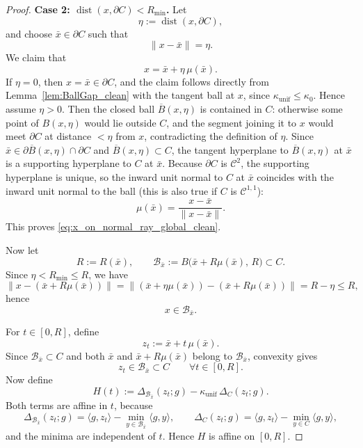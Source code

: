 \documentclass{article}
\begin{document}
\begin{proof}
\medskip
\noindent\textbf{Case 2: $\operatorname{dist}(x,\partial C)<R_{\min}$.}
Let
\[
\eta:=\operatorname{dist}(x,\partial C),
\]
and choose $\bar x\in\partial C$ such that
\begin{equation}
\|x-\bar x\|=\eta.
\label{eq:nearest_boundary_point_global_clean}
\end{equation}
We claim that
\begin{equation}
x=\bar x+\eta\,\mu(\bar x).
\label{eq:x_on_normal_ray_global_clean}
\end{equation}
If \(\eta=0\), then \(x=\bar x\in\partial C\), and the claim follows directly
from Lemma~\ref{lem:BallGap_clean} with the tangent ball at \(x\), since
\(\kappa_{\mathrm{unif}}\le \kappa_0\). Hence assume \(\eta>0\). Then the closed ball $\overline B(x,\eta)$ is contained in $C$: otherwise some point of $B(x,\eta)$ would lie outside $C$, and the segment joining it to $x$ would meet $\partial C$ at distance $<\eta$ from $x$, contradicting the definition of $\eta$.
Since $\bar x\in \partial \overline B(x,\eta)\cap\partial C$ and $\overline B(x,\eta)\subset C$, the tangent hyperplane to $\overline B(x,\eta)$ at $\bar x$ is a supporting hyperplane to $C$ at $\bar x$.
Because $\partial C$ is $\mathcal C^2$, the supporting hyperplane is unique, so the inward unit normal to $C$ at $\bar x$ coincides with the inward unit normal to the ball (this is also true if $C$ is $\mathcal{C}^{1,1}$):
\[
\mu(\bar x)=\frac{x-\bar x}{\|x-\bar x\|}.
\]
This proves \eqref{eq:x_on_normal_ray_global_clean}.

Now let
\begin{equation}
R:=R(\bar x),
\qquad
\mathcal B_{\bar x}:=B\bigl(\bar x+R\mu(\bar x),\,R\bigr)\subset C.
\label{eq:tangent_ball_at_xbar_global_clean}
\end{equation}
Since $\eta<R_{\min}\le R$, we have
\[
\|x-(\bar x+R\mu(\bar x))\|
=
\|(\bar x+\eta\mu(\bar x))-(\bar x+R\mu(\bar x))\|
=
R-\eta
\le R,
\]
hence
\begin{equation}
x\in\mathcal B_{\bar x}.
\label{eq:x_in_tangent_ball_global_clean}
\end{equation}

For $t\in[0,R]$, define
\[
z_t:=\bar x+t\,\mu(\bar x).
\]
Since $\mathcal B_{\bar x}\subset C$ and both $\bar x$ and $\bar x+R\mu(\bar x)$ belong to $\mathcal B_{\bar x}$, convexity gives
\[
z_t\in \mathcal B_{\bar x}\subset C
\qquad\forall t\in[0,R].
\]
Now define
\begin{equation}
H(t):=\Delta_{\mathcal B_{\bar x}}(z_t;g)-\kappa_{\mathrm{unif}}\,\Delta_C(z_t;g).
\label{eq:H_def_global_clean}
\end{equation}
Both terms are affine in $t$, because
\[
\Delta_{\mathcal B_{\bar x}}(z_t;g)
=
\langle g,z_t\rangle-\min_{y\in\mathcal B_{\bar x}}\langle g,y\rangle,
\qquad
\Delta_C(z_t;g)
=
\langle g,z_t\rangle-\min_{y\in C}\langle g,y\rangle,
\]
and the minima are independent of $t$.
Hence $H$ is affine on $[0,R]$.


\end{proof}
\end{document}

